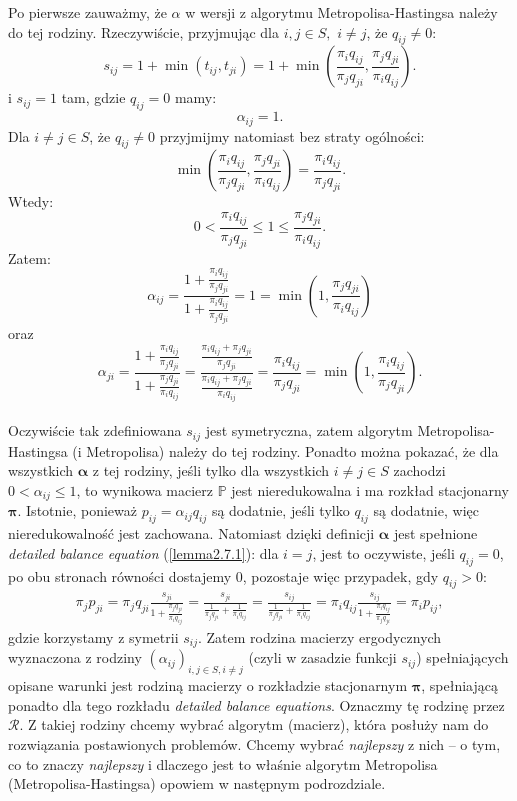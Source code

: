 \documentclass[a4paper]{article}
\theoremstyle{defn}
\theoremstyle{theorem}
\theoremstyle{lemma}
\theoremstyle{cor}
\theoremstyle{fact}
\begin{document}
Po pierwsze zauważmy, że $\alpha$ w wersji z algorytmu Metropolisa-Hastingsa należy do tej rodziny. Rzeczywiście, przyjmując dla $i,j \in S,\,\, i \neq j$, że $q_{ij} \neq 0$:
$$s_{ij} = 1 + \min(t_{ij}, t_{ji}) = 1 + \min\left(\frac{\pi_i q_{ij}}{\pi_j q_{ji}}, \frac{\pi_j q_{ji}}{\pi_i q_{ij}}\right).$$
i $s_{ij} = 1$ tam, gdzie $q_{ij} = 0$ 
mamy:
$$\alpha_{ij} = 1.$$
Dla $i \neq j \in S$, że $q_{ij} \neq 0$ przyjmijmy natomiast bez straty ogólności:
$$\min\left(\frac{\pi_i q_{ij}}{\pi_j q_{ji}}, \frac{\pi_j q_{ji}}{\pi_i q_{ij}}\right) = \frac{\pi_i q_{ij}}{\pi_j q_{ji}}.$$
Wtedy:
$$0 < \frac{\pi_i q_{ij}}{\pi_j q_{ji}} \leq 1 \leq \frac{\pi_j q_{ji}}{\pi_i q_{ij}}.$$
Zatem:
$$\alpha_{ij} = \frac{1 + \frac{\pi_i q_{ij}}{\pi_j q_{ji}}}{1 + \frac{\pi_i q_{ij}}{\pi_j q_{ji}}} = 1 = \min(1, \frac{\pi_j q_{ji}}{\pi_i q_{ij}})$$
oraz 
$$\alpha_{ji} = \frac{1 + \frac{\pi_i q_{ij}}{\pi_j q_{ji}}}{1 + \frac{\pi_j q_{ji}}{\pi_i q_{ij}}} = \frac{\frac{\pi_i q_{ij} + \pi_j q_{ji}}{\pi_j q_{ji}}}{\frac{\pi_i q_{ij} + \pi_j q_{ji}}{\pi_i q_{ij}}} = \frac{\pi_i q_{ij}}{\pi_j q_{ji}} = \min(1, \frac{\pi_i q_{ij}}{\pi_j q_{ji}}).$$
\\
Oczywiście tak zdefiniowana $s_{ij}$ jest symetryczna, zatem algorytm Metropolisa-Hastingsa (i Metropolisa) należy do tej rodziny. Ponadto można pokazać, że dla wszystkich $\boldsymbol{\alpha}$ z tej rodziny, jeśli tylko dla wszystkich $i \neq j \in S$ zachodzi $0 < \alpha_{ij} \leq 1$, to wynikowa macierz $\mathbb{P}$ jest nieredukowalna i ma rozkład stacjonarny $\boldsymbol{\pi}$. Istotnie, ponieważ $p_{ij} = \alpha_{ij}q_{ij}$ są dodatnie, jeśli tylko $q_{ij}$ są dodatnie, więc nieredukowalność jest zachowana. Natomiast dzięki definicji $\boldsymbol{\alpha}$ jest spełnione \textit{detailed balance equation} (\ref{lemma2.7.1}): dla $i = j$, jest to oczywiste, jeśli $q_{ij} = 0$, po obu stronach równości dostajemy $0$, pozostaje więc przypadek, gdy $q_{ij} > 0$:
\begin{align*}
\pi_j p_{ji} = \pi_j q_{ji} \frac{s_{ji}}{1 + \frac{\pi_j q_{ji}}{\pi_i q_{ij}}} = \frac{s_{ji}}{\frac{1}{\pi_j q_{ji}} + \frac{1}{\pi_i q_{ij}}} = \frac{s_{ij}}{\frac{1}{\pi_j q_{ji}} + \frac{1}{\pi_i q_{ij}}} = \pi_i q_{ij} \frac{s_{ij}}{1 + \frac{\pi_i q_{ij}}{\pi_j q_{ji}}} = \pi_i p_{ij},
\end{align*}
gdzie korzystamy z symetrii $s_{ij}$. Zatem rodzina macierzy ergodycznych wyznaczona z rodziny $(\alpha_{ij})_{i,j \in S, i \neq j}$ (czyli w zasadzie funkcji $s_{ij}$) spełniających opisane warunki jest rodziną macierzy o rozkładzie stacjonarnym $\boldsymbol{\pi}$, spełniającą ponadto dla tego rozkładu \textit{detailed balance equations}. Oznaczmy tę rodzinę przez $\mathcal{R}$.
Z takiej rodziny chcemy wybrać algorytm (macierz), która posłuży nam do rozwiązania postawionych problemów. Chcemy wybrać \textit{najlepszy} z nich – o tym, co to znaczy \textit{najlepszy} i dlaczego jest to właśnie algorytm Metropolisa (Metropolisa-Hastingsa) opowiem w następnym podrozdziale.
\end{document}
